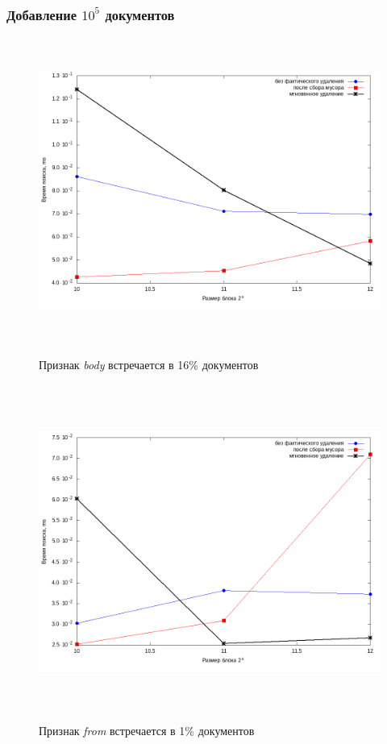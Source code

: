 \subsubsection{Добавление $10^5$ документов}


\begin{figure}[H]
\includegraphics[width=\linewidth, height=10cm]{fig/limit_1/1e5/body.png}
\caption{Признак \textit{body} встречается в 16\% документов}
\includegraphics[width=\linewidth, height=11cm]{fig/limit_1/1e5/from.png}
\caption{Признак \textit{from} встречается в 1\% документов}
\end{figure}

